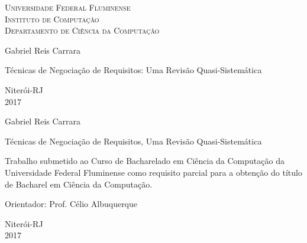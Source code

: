 \documentclass[a4paper,oneside,12pt]{book}
\begin{document}

\begin{titlepage}
  \begin{center}
    \Large{\textsc{Universidade Federal Fluminense} \\
           \textsc{Instituto de Computação} \\
           \textsc{Departamento de Ciência da Computação}
          }
    \par\vspace{3.0cm}
    \LARGE{Gabriel Reis Carrara}
    \par\vspace{3.0cm}
    \LARGE{Técnicas de Negociação de Requisitos: Uma Revisão Quasi-Sistemática}
    \par\vfill
    \Large{Niterói-RJ\\2017}
  \end{center}
\end{titlepage}




\setcounter{page}{2}




\begin{center}

Gabriel Reis Carrara


\vfill

Técnicas de Negociação de Requisitos, Uma Revisão Quasi-Sistemática

\vspace{3.0cm}

\begin{flushright}
\begin{minipage}{0.50\textwidth}

Trabalho submetido ao Curso de \linebreak Bacharelado em Ciência da
Computação da Universidade Federal Fluminense como
requisito parcial para a obtenção do título de Bacharel em Ciência da
Computação.

\end{minipage}
\end{flushright}

\vspace{3.0cm}

\begin{flushleft}
Orientador: Prof. Célio Albuquerque
\end{flushleft}

\vfill

Niterói-RJ\\2017

\end{center}
\end{document}
